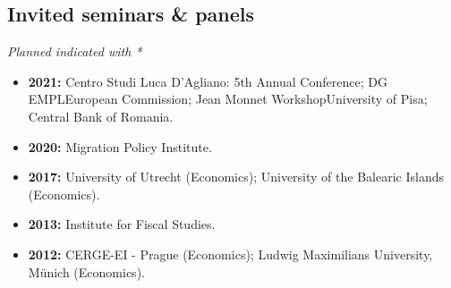 \documentclass[11pt]{article}
\begin{document}


\subsection*{\sc Invited seminars \& panels}
\textit{Planned indicated with *}
\begin{itemize}[itemsep=.9pt, leftmargin=20pt]
    \item[]\textbf{2021:} Centro Studi Luca D'Agliano: 5th Annual Conference; DG EMPL\textendash European Commission; Jean Monnet Workshop\textendash University of Pisa; Central Bank of Romania.
    \item[]\textbf{2020:} Migration Policy Institute.
    \item[]\textbf{2017:} University of Utrecht (Economics); University of the Balearic Islands (Economics).
    \item[]\textbf{2013:} Institute for Fiscal Studies.
    \item[]\textbf{2012:} CERGE-EI - Prague (Economics); Ludwig Maximilians University, M\"unich (Economics).

\end{itemize}
\end{document}
